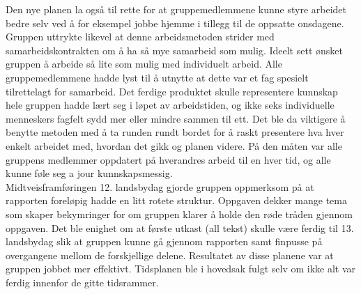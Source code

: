 Den nye planen la også til rette for at gruppemedlemmene kunne styre arbeidet bedre selv ved å for eksempel jobbe hjemme i tillegg til de oppsatte onsdagene.
Gruppen uttrykte likevel at denne arbeidsmetoden strider med samarbeidskontrakten om å ha så mye samarbeid som mulig.
Ideelt sett ønsket gruppen å arbeide så lite som mulig med individuelt arbeid.
Alle gruppemedlemmene hadde lyst til å utnytte at dette var et fag spesielt tilrettelagt for samarbeid.
Det ferdige produktet skulle representere kunnskap hele gruppen hadde lært seg i løpet av arbeidstiden, og ikke seks individuelle menneskers fagfelt sydd mer eller mindre sammen til ett.
Det ble da viktigere å benytte metoden med å ta runden rundt bordet for å raskt presentere hva hver enkelt arbeidet med, hvordan det gikk og planen videre.
På den måten var alle gruppens medlemmer oppdatert på hverandres arbeid til en hver tid, og alle kunne føle seg a jour kunnskapsmessig.\\

Midtveisframføringen 12. landsbydag gjorde gruppen oppmerksom på at rapporten foreløpig hadde en litt rotete struktur.
Oppgaven dekker mange tema som skaper bekymringer for om gruppen klarer å holde den røde tråden gjennom oppgaven.
Det ble enighet om at første utkast (all tekst) skulle være ferdig til 13. landsbydag slik at gruppen kunne gå gjennom rapporten samt finpusse på overgangene mellom de forskjellige delene.
Resultatet av disse planene var at gruppen jobbet mer effektivt.
Tidsplanen ble i hovedsak fulgt selv om ikke alt var ferdig innenfor de gitte tidsrammer. \\

